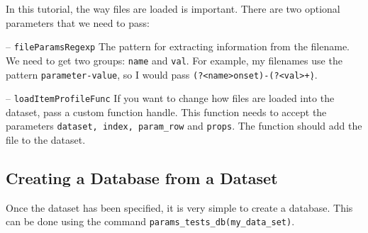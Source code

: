 \documentclass{article}
\let\oldmarginpar\marginpar
\renewcommand\marginpar[1]{\-\oldmarginpar[\raggedleft #1]%
{\raggedright #1}}
\newenvironment{checklist}{%
  \begin{list}{}{}%
  \let\olditem\item
  \renewcommand\item{\olditem -- \marginpar{$\Box$} }
  \newcommand\checkeditem{\olditem -- \marginpar{$\CheckedBox$} }
}{%
  \end{list}
}
\begin{document}
In this tutorial, the way files are loaded is important. There are two optional parameters that we need to pass:

\begin{checklist}
	\item		\texttt{fileParamsRegexp} The pattern for extracting information from the filename. We need to get two groups: \texttt{name} and \texttt{val}. For example, my filenames use the pattern \texttt{parameter-value}, so I would pass \texttt{(?<name>onset)-(?<val>\d+)}.
	\item		\texttt{loadItemProfileFunc} If you want to change how files are loaded into the dataset, pass a custom function handle. This function needs to accept the parameters \texttt{dataset, index, param\_row} and \texttt{props}. The function should add the file to the dataset.
\end{checklist}

\subsection{Creating a Database from a Dataset}

Once the dataset has been specified, it is very simple to create a database. This can be done using the command \texttt{params\_tests\_db(my\_data\_set)}.
\end{document}
